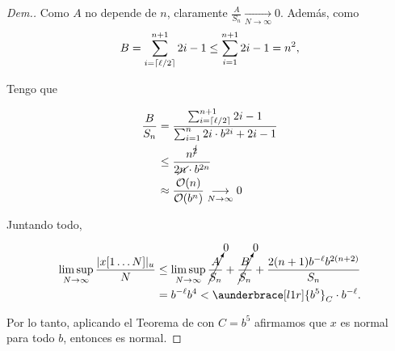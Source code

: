 \documentclass{article}
\DeclarePairedDelimiter\ceil{\lceil}{\rceil}
\newcommand{\BigO}{\mathcal{O}}
\theoremstyle{definition} %
\begin{document}
\begin{proof}[Dem.]
Como $A$ no depende de $n$, claramente $\frac{A}{S_n} \underset{N \to
\infty}{\longrightarrow} 0$. Además, como
$$B = \sum_{i = \ceil{\ell/2}}^{n+1} 2i - 1 \leq \sum_{i = 1}^{n+1} 2i - 1 = n^2,$$

Tengo que

\begin{align*}
    \frac{B}{S_n}
        &= \frac
            {\sum_{i = \ceil{\ell/2}}^{n+1} 2i - 1}
            {\sum_{i=1}^{n} 2i \cdot b^{2i} + 2i - 1} \\
        &\leq \frac
            {n^{\cancel{2}}}
            {2\cancel{n} \cdot b^{2n}}\\
        &\approx \frac{\BigO(n)}{\BigO(b^n)}
        \underset{N \to
        \infty}{\longrightarrow} 0
\end{align*}

Juntando todo,

\begin{align*}
    \limsup_{N \to \infty} \frac{|x[1\dots N]|_u}{N}
        &\leq \limsup_{N \to \infty}
            \cancelto{0}{\frac{A}{S_n}} +
            \cancelto{0}{\frac{B}{S_n}} +
            \frac{2(n+1) b^{-\ell} b^{2(n+2)}}{S_n} \\
        &= b^{-\ell}b^4 < \aunderbrace[l1r]{b^5}_{C} \cdot b^{-\ell}.
\end{align*}

Por lo tanto, aplicando el Teorema de  con $C =
b^5$ afirmamos que $x$ es normal para todo $b$, entonces es normal.

\end{proof}
\end{document}
